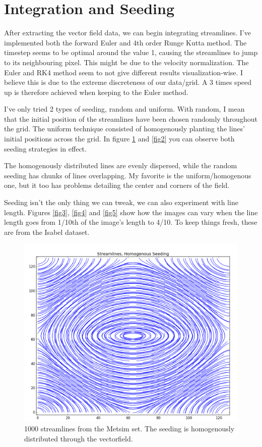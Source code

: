 \documentclass[a4paper,10pt]{report}
\begin{document}
\section*{Integration and Seeding}
After extracting the vector field data, we can begin integrating streamlines.
I've implemented both the forward Euler and 4th order Runge Kutta method. The timestep seems to be optimal around the value 1, causing the streamlines to jump to its neighbouring pixel. This might be due to the velocity normalization.
The Euler and RK4 method seem to not give different results visualization-wise. I believe this is due to the extreme discreteness of our data/grid. A 3 times speed up is therefore achieved when keeping to the Euler method.

I've only tried 2 types of seeding, random and uniform. With random, I mean that the initial position of the streamlines have been chosen randomly throughout the grid. The uniform technique consisted of homogenously planting 
the lines' initial positions across the grid. In figure \ref{fig1} and \ref{fig2} you can observe both seeding strategies in effect. 

The homogenously distributed lines are evenly dispersed, while the random seeding has chunks of lines overlapping.
My favorite is the uniform/homogenous one, but it too has problems detailing the center and corners of the field.

Seeding isn't the only thing we can tweak, we can also experiment with line length. Figures \ref{fig3}, \ref{fig4} and \ref{fig5} show how the images can vary when the line length goes from 1/10th of the image's length to 4/10. To keep things fresh, these are from the Isabel dataset.



\begin{figure}\centering
 \includegraphics[width=0.9\linewidth]{homo}
 \caption{1000 streamlines from the Metsim set. The seeding is homogenously distributed through the vectorfield.}
 \label{fig1}
\end{figure}
\end{document}

